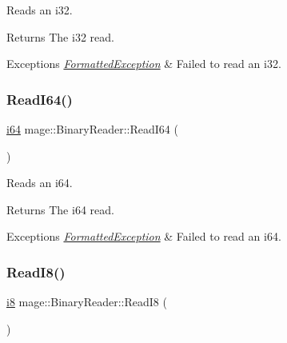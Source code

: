 Reads an {\ttfamily i32}.

\begin{DoxyReturn}{Returns}
The {\ttfamily i32} read. 
\end{DoxyReturn}

\begin{DoxyExceptions}{Exceptions}
{\em \hyperlink{structmage_1_1_formatted_exception}{Formatted\+Exception}} & Failed to read an {\ttfamily i32}. \\
\hline
\end{DoxyExceptions}
\hypertarget{classmage_1_1_binary_reader_af6d39f753e912c5ec1da13d411f756c0}{}\label{classmage_1_1_binary_reader_af6d39f753e912c5ec1da13d411f756c0} 
\subsubsection{\texorpdfstring{Read\+I64()}{ReadI64()}}
{\footnotesize\ttfamily \hyperlink{namespacemage_a3d629c1ab28148a782661e5b14b6fe5e}{i64} mage\+::\+Binary\+Reader\+::\+Read\+I64 (\begin{DoxyParamCaption}{ }\end{DoxyParamCaption})\hspace{0.3cm}{\ttfamily [protected]}}

Reads an {\ttfamily i64}.

\begin{DoxyReturn}{Returns}
The {\ttfamily i64} read. 
\end{DoxyReturn}

\begin{DoxyExceptions}{Exceptions}
{\em \hyperlink{structmage_1_1_formatted_exception}{Formatted\+Exception}} & Failed to read an {\ttfamily i64}. \\
\hline
\end{DoxyExceptions}
\hypertarget{classmage_1_1_binary_reader_a80a9edbeb61e1e88c79a2f7d947ca872}{}\label{classmage_1_1_binary_reader_a80a9edbeb61e1e88c79a2f7d947ca872} 
\subsubsection{\texorpdfstring{Read\+I8()}{ReadI8()}}
{\footnotesize\ttfamily \hyperlink{namespacemage_ae590501eabc5b30d993320c2159423ee}{i8} mage\+::\+Binary\+Reader\+::\+Read\+I8 (\begin{DoxyParamCaption}{ }\end{DoxyParamCaption})\hspace{0.3cm}{\ttfamily [protected]}}

